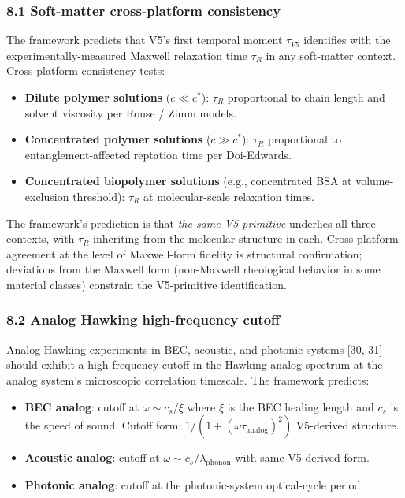 \documentclass[
  11pt,
  a4paperpaper,
]{article}
\providecommand{\tightlist}{%
  \setlength{\itemsep}{0pt}\setlength{\parskip}{0pt}}
\begin{document}
\subsubsection{8.1 Soft-matter cross-platform
consistency}\label{soft-matter-cross-platform-consistency}

The framework predicts that V5's first temporal moment \(\tau_{V5}\)
identifies with the experimentally-measured Maxwell relaxation time
\(\tau_R\) in any soft-matter context. Cross-platform consistency tests:

\begin{itemize}
\tightlist
\item
  \textbf{Dilute polymer solutions} (\(c \ll c^*\)): \(\tau_R\)
  proportional to chain length and solvent viscosity per Rouse / Zimm
  models.
\item
  \textbf{Concentrated polymer solutions} (\(c \gg c^*\)): \(\tau_R\)
  proportional to entanglement-affected reptation time per Doi-Edwards.
\item
  \textbf{Concentrated biopolymer solutions} (e.g., concentrated BSA at
  volume-exclusion threshold): \(\tau_R\) at molecular-scale relaxation
  times.
\end{itemize}

The framework's prediction is that \emph{the same V5 primitive}
underlies all three contexts, with \(\tau_R\) inheriting from the
molecular structure in each. Cross-platform agreement at the level of
Maxwell-form fidelity is structural confirmation; deviations from the
Maxwell form (non-Maxwell rheological behavior in some material classes)
constrain the V5-primitive identification.

\subsubsection{8.2 Analog Hawking high-frequency
cutoff}\label{analog-hawking-high-frequency-cutoff}

Analog Hawking experiments in BEC, acoustic, and photonic systems {[}30,
31{]} should exhibit a high-frequency cutoff in the Hawking-analog
spectrum at the analog system's microscopic correlation timescale. The
framework predicts:

\begin{itemize}
\tightlist
\item
  \textbf{BEC analog}: cutoff at \(\omega \sim c_s/\xi\) where \(\xi\)
  is the BEC healing length and \(c_s\) is the speed of sound. Cutoff
  form: \(1/(1+(\omega\tau_{\mathrm{analog}})^2)\) V5-derived structure.
\item
  \textbf{Acoustic analog}: cutoff at
  \(\omega \sim c_s/\lambda_{\mathrm{phonon}}\) with same V5-derived
  form.
\item
  \textbf{Photonic analog}: cutoff at the photonic-system optical-cycle
  period.
\end{itemize}
\end{document}
